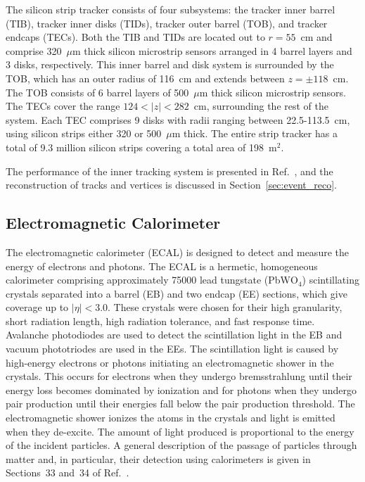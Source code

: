 The silicon strip tracker consists of four subsystems: the tracker inner barrel (TIB), tracker inner disks (TIDs), tracker outer barrel (TOB), and tracker endcaps (TECs). Both the TIB and TIDs are located out to $r=55$~cm and comprise 320~$\mu$m thick silicon microstrip sensors arranged in 4 barrel layers and 3 disks, respectively. This inner barrel and disk system is surrounded by the TOB, which has an outer radius of 116~cm and extends between $z=\pm118$~cm. The TOB consists of 6 barrel layers of 500~$\mu$m thick silicon microstrip sensors. The TECs cover the range $124<|z|<282$~cm, surrounding the rest of the system. Each TEC comprises 9 disks with radii ranging between 22.5-113.5~cm, using silicon strips either 320 or 500~$\mu$m thick. The entire strip tracker has a total of 9.3 million silicon strips covering a total area of 198~$\textrm{m}^2$.

The performance of the inner tracking system is presented in Ref.~\cite{Chatrchyan:2014fea}, and the reconstruction of tracks and vertices is discussed in Section~\ref{sec:event_reco}.


\subsection{Electromagnetic Calorimeter}\label{sec:ECAL}

The electromagnetic calorimeter (ECAL) is designed to detect and measure the energy of electrons and photons. The ECAL is a hermetic, homogeneous calorimeter comprising approximately 75000 lead tungstate (PbW$\text{O}_4$) scintillating crystals separated into a barrel (EB) and two endcap (EE) sections, which give coverage up to $|\eta|<3.0$. These crystals were chosen for their high granularity, short radiation length, high radiation tolerance, and fast response time. Avalanche photodiodes are used to detect the scintillation light in the EB and vacuum phototriodes are used in the EEs. The scintillation light is caused by high-energy electrons or photons initiating an electromagnetic shower in the crystals. This occurs for electrons when they undergo bremsstrahlung until their energy loss becomes dominated by ionization and for photons when they undergo pair production until their energies fall below the pair production threshold. The electromagnetic shower ionizes the atoms in the crystals and light is emitted when they de-excite. The amount of light produced is proportional to the energy of the incident particles. A general description of the passage of particles through matter and, in particular, their detection using calorimeters is given in Sections~33 and~34 of Ref.~\cite{Tanabashi:2018oca}.

